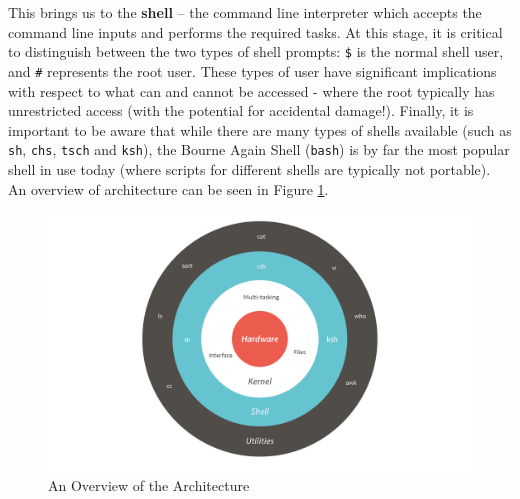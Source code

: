 \documentclass[11pt]{article}
\begin{document}
This brings us to the \textbf{shell} -- the command line interpreter which accepts the command line inputs and performs the required tasks. At this stage, it is critical to distinguish between the two types of shell prompts: \texttt{\$} is the normal shell user, and \texttt{\#} represents the root user. These types of user have significant implications with respect to what can and cannot be accessed - where the root typically has unrestricted access (with the potential for accidental damage!). Finally, it is important to be aware that while there are many types of shells available (such as \texttt{sh}, \texttt{chs}, \texttt{tsch} and \texttt{ksh}), the Bourne Again Shell (\texttt{bash}) is by far the most popular shell in use today (where scripts for different shells are typically not portable). An overview of architecture can be seen in Figure \ref{shellandscape}.

\begin{figure}[!t]
\caption{An Overview of the Architecture}\label{shellandscape}
\centering
\includegraphics[width=.95\textwidth]{Infographic1}
\end{figure}
\end{document}
